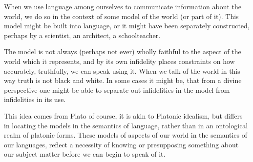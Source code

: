 When we use language among ourselves to communicate information about the world, we do so in the context of some model of the world (or part of it).
This model might be built into language, or it might have been separately constructed, perhaps by a scientist, an architect, a schoolteacher.

The model is not always (perhaps not ever) wholly faithful to the aspect of the world which it represents, and by its own infidelity places constraints on how accurately, truthfully, we can speak using it.
When we talk of the world in this way truth is not black and white.
In some cases it might be, that from a divine perspective one might be able to separate out infidelities in the model from infidelities in its use.

This idea comes from Plato of course, it is akin to Platonic idealism, but differs in locating the models in the semantics of language, rather than in an ontological realm of platonic forms.
These models of aspects of our world in the semantics of our languages, reflect a necessity of knowing or presupposing something about our subject matter before we can begin to speak of it.